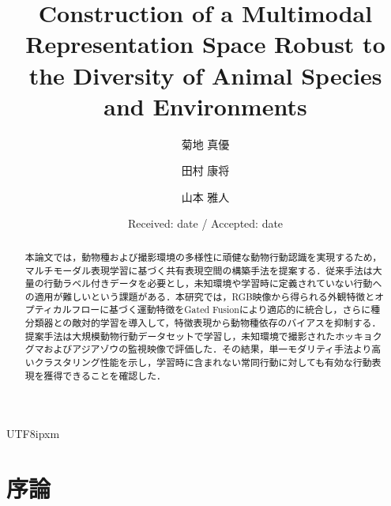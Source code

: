 \documentclass[twocolumn]{svjour3}
\begin{document}
\begin{CJK}{UTF8}{ipxm}

\title{Construction of a Multimodal Representation Space Robust to\\the Diversity of Animal Species and Environments}


\author{菊地 真優 \and
        田村 康将 \and
        山本 雅人}



\date{Received: date / Accepted: date}

\maketitle

\begin{abstract}
本論文では，動物種および撮影環境の多様性に頑健な動物行動認識を実現するため，マルチモーダル表現学習に基づく共有表現空間の構築手法を提案する．従来手法は大量の行動ラベル付きデータを必要とし，未知環境や学習時に定義されていない行動への適用が難しいという課題がある．本研究では，RGB映像から得られる外観特徴とオプティカルフローに基づく運動特徴をGated Fusionにより適応的に統合し，さらに種分類器との敵対的学習を導入して，特徴表現から動物種依存のバイアスを抑制する．提案手法は大規模動物行動データセットで学習し，未知環境で撮影されたホッキョクグマおよびアジアゾウの監視映像で評価した．その結果，単一モダリティ手法より高いクラスタリング性能を示し，学習時に含まれない常同行動に対しても有効な行動表現を獲得できることを確認した．
\end{abstract}

\section{序論}
\label{sec:intro}


\end{CJK}
\end{document}
